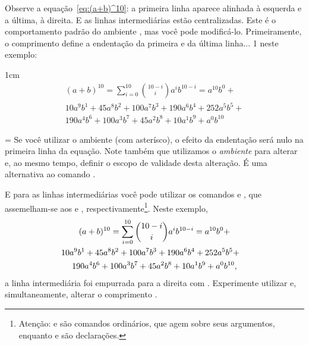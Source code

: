 \documentclass[a4paper,12pt]{amsart}
\newlength\atencaowidth
\newenvironment{atencao}{%
		\medskip%
		\noindent\hangindent=\atencaowidth\hangafter=-2%
		\hspace{-\atencaowidth}%
		\usebox{\atencaobox}\footnotesize
		\setlength\parindent\atencaowidth}{\par\medskip}
\begin{document}
	Observe a equação~\eqref{eq:(a+b)^10}: a primeira linha aparece alinhada à esquerda e a última, à direita. E as linhas intermediárias estão centralizadas. Este é o comportamento padrão do ambiente , mas você pode modificá-lo. Primeiramente, o comprimento  define a endentação da primeira e da última linha... \unit{1}{\centi\metre} neste exemplo:
	\begin{setlength}{\multlinegap}{1cm}
		\begin{multline*}
			(a + b)^{10} = \sum_{i = 0}^{10} \binom{10 - i}{i} a^i b^{10 - i} =
			    a^{10} b^{ 0} + \\
			 10 a^{ 9} b^{ 1} +
			 45 a^{ 8} b^{ 2} +
			100 a^{ 7} b^{ 3} +
			190 a^{ 6} b^{ 4} +
			252 a^{ 5} b^{ 5} + \\
			190 a^{ 4} b^{ 6} +
			100 a^{ 3} b^{ 7} +
			 45 a^{ 2} b^{ 8} +
			 10 a^{ 1} b^{ 9} +
		      a^{ 0} b^{10}
		\end{multline*}
	\end{setlength}
	
	\begin{atencao}%
		Se você utilizar o ambiente  (com asterísco), o efeito da endentação será nulo na primeira linha da equação. Note também que utilizamos o \emph{ambiente}  para alterar  e, ao mesmo tempo, definir o escopo de validade desta alteração. É uma alternativa ao comando .
	\end{atencao}
	
	E para as linhas intermediárias você pode utilizar os comandos  e , que assemelham-se aos  e , respectivamente\footnote{Atenção:  e  são comandos ordinários, que agem sobre seus argumentos, enquanto  e  são declarações.}. Neste exemplo,
	\begin{multline*}
		(a + b)^{10} = \sum_{i = 0}^{10} \binom{10 - i}{i} a^i b^{10 - i} =
		    a^{10} b^{ 0} + \\
		 \shoveright{ %
		 10 a^{ 9} b^{ 1} +
		 45 a^{ 8} b^{ 2} +
		100 a^{ 7} b^{ 3} +
		190 a^{ 6} b^{ 4} +
		252 a^{ 5} b^{ 5} +} \\ %
		190 a^{ 4} b^{ 6} +
		100 a^{ 3} b^{ 7} +
		 45 a^{ 2} b^{ 8} +
		 10 a^{ 1} b^{ 9} +
	      a^{ 0} b^{10},
	\end{multline*}
	a linha intermediária foi empurrada para a direita com . Experimente utilizar  e, simultaneamente, alterar o comprimento .
	
\end{document}
